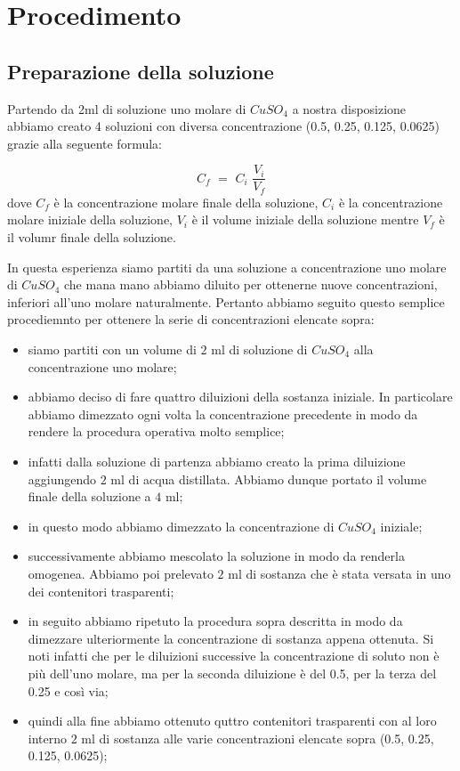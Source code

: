 \section{Procedimento}

\subsection{Preparazione della soluzione}

Partendo da 2ml di soluzione uno molare di $CuSO_4$ a nostra disposizione abbiamo creato 4 soluzioni con diversa concentrazione (0.5, 0.25, 0.125, 0.0625) grazie alla seguente formula:

\begin{equation}
	C_f \,\, = \,\, C_i \,\, \frac{V_i}{V_f}
	\label{eq:proporzione}
\end{equation}
%
dove $C_f$ è la concentrazione molare finale della soluzione, $C_i$ è la concentrazione molare iniziale della soluzione, $V_i$ è il volume iniziale della soluzione mentre $V_f$ è il volumr finale della soluzione.

In questa esperienza siamo partiti da una soluzione a concentrazione uno molare di $CuSO_4$ che mana mano abbiamo diluito per ottenerne nuove concentrazioni, inferiori all'uno molare naturalmente.
Pertanto abbiamo seguito questo semplice procediemnto per ottenere la serie di concentrazioni elencate sopra:

\begin{itemize}
	\item{siamo partiti con un volume di $2\,\,\si{\milli\litre}$ di soluzione di $CuSO_4$ alla concentrazione uno molare;}
	\item{abbiamo deciso di fare quattro diluizioni della sostanza iniziale. In particolare abbiamo dimezzato ogni volta la concentrazione precedente in modo da rendere la procedura operativa molto semplice;}
	\item{infatti dalla soluzione di partenza abbiamo creato la prima diluizione aggiungendo $2\,\,\si{\milli\litre}$ di acqua distillata. Abbiamo dunque portato il volume finale della soluzione a $4\,\,\si{\milli\litre}$;}
	\item{in questo modo abbiamo dimezzato la concentrazione di $CuSO_4$ iniziale;}
	\item{successivamente abbiamo mescolato la soluzione in modo da renderla omogenea. Abbiamo poi prelevato $2\,\,\si{\milli\litre}$ di sostanza che è stata versata in uno dei contenitori trasparenti;}
	\item{in seguito abbiamo ripetuto la procedura sopra descritta in modo da dimezzare ulteriormente la concentrazione di sostanza appena ottenuta. Si noti infatti che per le diluizioni successive la concentrazione di soluto non è più dell'uno molare, ma per la seconda diluizione è del 0.5, per la terza del 0.25 e così via;}
	\item{quindi alla fine abbiamo ottenuto quttro contenitori trasparenti con al loro interno $2\,\,\si{\milli\litre}$ di sostanza alle varie concentrazioni elencate sopra (0.5, 0.25, 0.125, 0.0625);}
\end{itemize}

